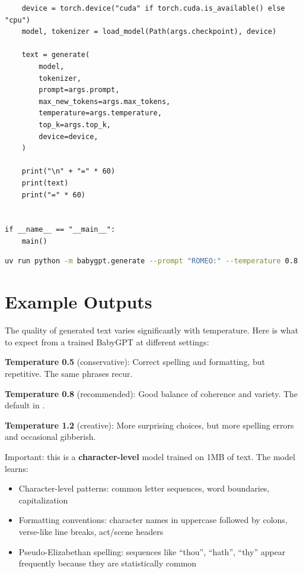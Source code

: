 \begin{lstlisting}
    device = torch.device("cuda" if torch.cuda.is_available() else "cpu")
    model, tokenizer = load_model(Path(args.checkpoint), device)

    text = generate(
        model,
        tokenizer,
        prompt=args.prompt,
        max_new_tokens=args.max_tokens,
        temperature=args.temperature,
        top_k=args.top_k,
        device=device,
    )

    print("\n" + "=" * 60)
    print(text)
    print("=" * 60)


if __name__ == "__main__":
    main()
\end{lstlisting}

\shelltag
\begin{lstlisting}[language=bash]
uv run python -m babygpt.generate --prompt "ROMEO:" --temperature 0.8
\end{lstlisting}


\section{Example Outputs}

The quality of generated text varies significantly with temperature. Here is what to expect from a trained BabyGPT at different settings:

\textbf{Temperature 0.5} (conservative): Correct spelling and formatting, but repetitive. The same phrases recur.

\textbf{Temperature 0.8} (recommended): Good balance of coherence and variety. The default in .

\textbf{Temperature 1.2} (creative): More surprising choices, but more spelling errors and occasional gibberish.

Important: this is a \textbf{character-level} model trained on 1MB of text. The model learns:

\begin{itemize}
  \item Character-level patterns: common letter sequences, word boundaries, capitalization
  \item Formatting conventions: character names in uppercase followed by colons, verse-like line breaks, act/scene headers
  \item Pseudo-Elizabethan spelling: sequences like ``thou'', ``hath'', ``thy'' appear frequently because they are statistically common
\end{itemize}

